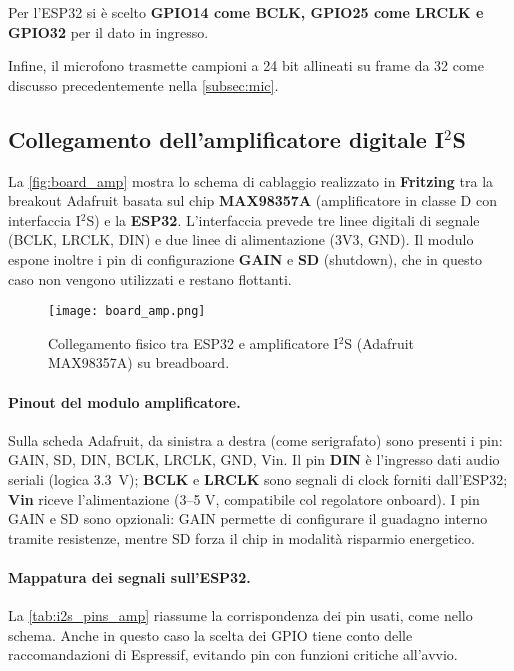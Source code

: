   Per l’ESP32 si è scelto \textbf{GPIO14 come BCLK, GPIO25 come LRCLK e GPIO32} per il dato in ingresso.
    
  Infine, il microfono trasmette campioni a 24 bit allineati su frame da 32 come discusso precedentemente nella \autoref{subsec:mic}.
  
 
\subsection{Collegamento dell’amplificatore digitale I$^2$S}
\label{subsec:conn_amp}

La \autoref{fig:board_amp} mostra lo schema di cablaggio realizzato in \textbf{Fritzing} tra la breakout Adafruit basata sul chip \textbf{MAX98357A}
 (amplificatore in classe D con interfaccia I$^2$S) e la \textbf{ESP32}.  
L’interfaccia prevede tre linee digitali di segnale
(BCLK, LRCLK, DIN) e due linee di alimentazione (3V3, GND). Il modulo espone inoltre i pin di configurazione \textbf{GAIN} e \textbf{SD} (shutdown), 
che in questo caso non vengono utilizzati e restano flottanti.

\begin{figure}[H]
  \centering
  \texttt{[image: board\_amp.png]}
  \caption{Collegamento fisico tra ESP32 e amplificatore I$^2$S (Adafruit MAX98357A) su breadboard.}
  \label{fig:board_amp}
\end{figure} 

\paragraph{Pinout del modulo amplificatore.}
Sulla scheda Adafruit, da sinistra a destra (come serigrafato) sono presenti i pin: GAIN, SD, DIN, BCLK, LRCLK, GND, Vin.  
Il pin \textbf{DIN} è l’ingresso dati audio seriali (logica \SI{3.3}{\volt}); \textbf{BCLK} e \textbf{LRCLK} sono segnali di clock forniti dall’ESP32; \textbf{Vin} riceve l’alimentazione (3–5 V, compatibile col regolatore onboard).  
I pin GAIN e SD sono opzionali: GAIN permette di configurare il guadagno interno tramite resistenze, mentre SD forza il chip in modalità risparmio energetico.

\paragraph{Mappatura dei segnali sull'ESP32.}
La \autoref{tab:i2s_pins_amp} riassume la corrispondenza dei pin usati, come nello schema. Anche in questo caso la scelta dei GPIO tiene conto delle raccomandazioni di Espressif, evitando pin con funzioni critiche all’avvio.


